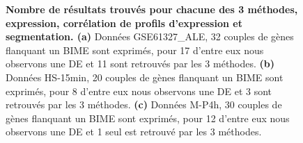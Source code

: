 \documentclass[12pt,a4paper]{report}
\begin{document}
\begin{figure}[h!]
\caption{\textbf{Nombre de résultats trouvés pour chacune des 3 méthodes, expression, corrélation de profils d'expression et segmentation. (a)} Données GSE61327\_ALE, 32 couples de gènes flanquant un BIME sont exprimés, pour 17 d'entre eux nous observons une DE et 11 sont retrouvés par les 3 méthodes. \textbf{(b)} Données HS-15min, 20 couples de gènes flanquant un BIME sont exprimés, pour 8 d'entre eux nous observons une DE et 3 sont retrouvés par les 3 méthodes. \textbf{(c)} Données M-P4h, 30 couples de gènes flanquant un BIME sont exprimés, pour 12 d'entre eux nous observons une DE et 1 seul est retrouvé par les 3 méthodes.} 
\end{figure}
\end{document}
